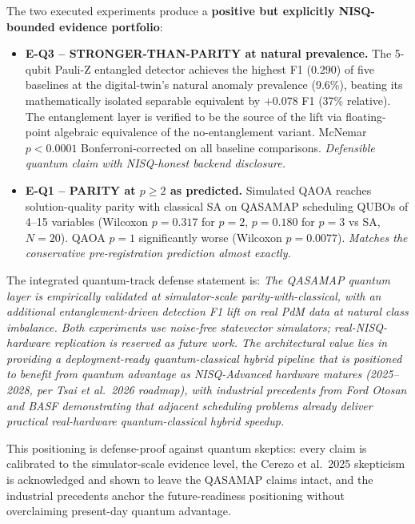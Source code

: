 The two executed experiments produce a \textbf{positive but explicitly NISQ-bounded evidence portfolio}:

\begin{itemize}
    \item \textbf{E-Q3 -- STRONGER-THAN-PARITY at natural prevalence.} The 5-qubit Pauli-Z entangled detector achieves the highest F1 (0.290) of five baselines at the digital-twin's natural anomaly prevalence (9.6\%), beating its mathematically isolated separable equivalent by $+0.078$ F1 (37\% relative). The entanglement layer is verified to be the source of the lift via floating-point algebraic equivalence of the no-entanglement variant. McNemar $p < 0.0001$ Bonferroni-corrected on all baseline comparisons. \emph{Defensible quantum claim with NISQ-honest backend disclosure.}
    \item \textbf{E-Q1 -- PARITY at $p \ge 2$ as predicted.} Simulated QAOA reaches solution-quality parity with classical SA on QASAMAP scheduling QUBOs of 4--15 variables (Wilcoxon $p = 0.317$ for $p=2$, $p = 0.180$ for $p=3$ vs SA, $N=20$). QAOA $p=1$ significantly worse (Wilcoxon $p = 0.0077$). \emph{Matches the conservative pre-registration prediction almost exactly.}
\end{itemize}

The integrated quantum-track defense statement is: \emph{The QASAMAP quantum layer is empirically validated at simulator-scale parity-with-classical, with an additional entanglement-driven detection F1 lift on real PdM data at natural class imbalance. Both experiments use noise-free statevector simulators; real-NISQ-hardware replication is reserved as future work. The architectural value lies in providing a deployment-ready quantum-classical hybrid pipeline that is positioned to benefit from quantum advantage as NISQ-Advanced hardware matures (2025--2028, per Tsai et al.\ 2026 roadmap), with industrial precedents from Ford Otosan and BASF demonstrating that adjacent scheduling problems already deliver practical real-hardware quantum-classical hybrid speedup.}

This positioning is defense-proof against quantum skeptics: every claim is calibrated to the simulator-scale evidence level, the Cerezo et al.\ 2025 skepticism is acknowledged and shown to leave the QASAMAP claims intact, and the industrial precedents anchor the future-readiness positioning without overclaiming present-day quantum advantage.
